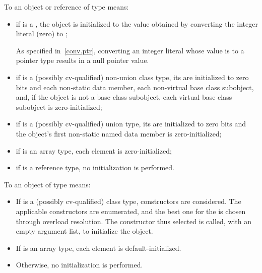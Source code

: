 \pnum
{}%
%
%
To
an object or reference of type
means:
\begin{itemize}
\item
if
is a , the
object
is initialized to the value obtained by converting the integer literal 
(zero) to
;
\begin{footnote}
As specified in~\ref{conv.ptr}, converting an integer
literal whose value is
to a pointer type results in a null pointer value.
\end{footnote}

\item
if
is a (possibly cv-qualified) non-union class type,
its  are initialized to zero bits and
each non-static data member,
each non-virtual base class subobject, and,
if the object is not a base class subobject,
each virtual base class subobject
is zero-initialized;

\item
if
is a (possibly cv-qualified) union type,
its  are initialized to zero bits and
the
object's first non-static named
data member
is zero-initialized;

\item
if
is an array type,
each element is zero-initialized;
\item
if
is a reference type, no initialization is performed.
\end{itemize}

\pnum
To
an object of type
means:
\begin{itemize}
\item
If
is a (possibly cv-qualified) class type,
constructors are considered. The applicable constructors are
enumerated, and the best one for the
 \tcode{()} is chosen through
overload resolution. The constructor thus selected
is called, with an empty argument list, to initialize the object.

\item
If
is an array type, each element is default-initialized.

\item
Otherwise,
no initialization is performed.
\end{itemize}

